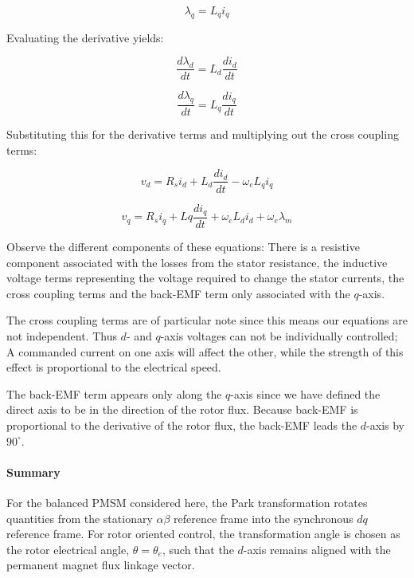 \documentclass{article}
\begin{document}
\begin{equation}
    \lambda_q = L_q i_q
\end{equation}

Evaluating the derivative yields:

\begin{equation}
    \frac{d\lambda_d}{dt} = L_d\frac{di_d}{dt}
\end{equation}

\begin{equation}
    \frac{d\lambda_q}{dt} = L_q\frac{di_q}{dt}
\end{equation}

Substituting this for the derivative terms and multiplying out the cross coupling terms:

\begin{equation}
    v_d = R_si_d + L_d\frac{di_d}{dt} - \omega_eL_qi_q
\end{equation}

\begin{equation}
    v_q = R_si_q + Lq\frac{di_q}{dt} + \omega_eL_di_d + \omega_e\lambda_m
\end{equation}

Observe the different components of these equations: There is a resistive component associated with the losses from the stator resistance, the inductive voltage terms representing the voltage required to change the stator currents, the cross coupling terms and the back-EMF term only associated with the $q$-axis.

The cross coupling terms are of particular note since this means our equations are not independent. Thus $d$- and $q$-axis voltages can not be individually controlled; A commanded current on one axis will affect the other, while the strength of this effect is proportional to the electrical speed.

The back-EMF term appears only along the $q$-axis since we have defined the direct axis to be in the direction of the rotor flux. Because back-EMF is proportional to the derivative of the rotor flux, the back-EMF leads the $d$-axis by $90^\circ$.



\paragraph{Summary}
For the balanced PMSM considered here, the Park transformation rotates quantities from the stationary $\alpha\beta$ reference frame into the synchronous $dq$ reference frame. For rotor oriented control, the transformation angle is chosen as the rotor electrical angle, $\theta = \theta_e$, such that the $d$-axis remains aligned with the permanent magnet flux linkage vector.
\end{document}
